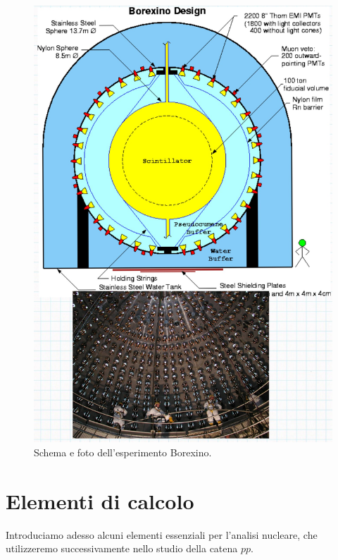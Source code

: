 \begin{itemize}
\begin{figure}[p!h]
        \centering
        \includegraphics[scale=0.2]{Immagini/0322_borexino.png}
        \caption{Schema e foto dell'esperimento Borexino.}
        \label{0322_box}
    \end{figure}
\end{itemize}

\newpage

\section{Elementi di calcolo}
Introduciamo adesso alcuni elementi essenziali per l'analisi nucleare, che utilizzeremo successivamente nello studio della catena $pp$.

